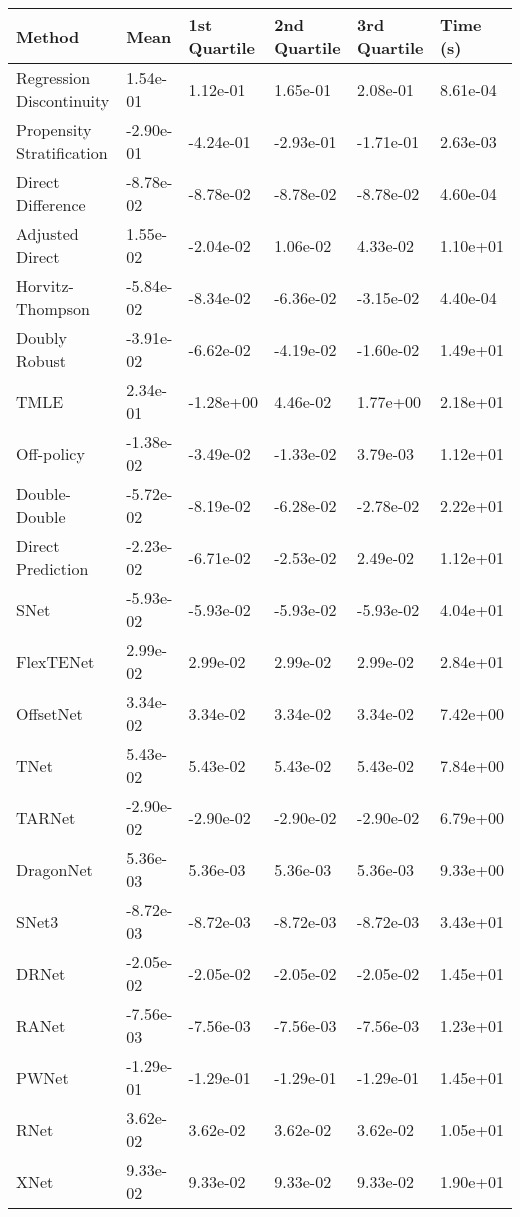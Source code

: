 \begin{tabular}{llllll}
  \toprule
  \textbf{Method} & \textbf{Mean} & \textbf{1st Quartile} & \textbf{2nd Quartile} & \textbf{3rd Quartile} & \textbf{Time (s)} \\ \midrule 
Regression Discontinuity & 1.54e-01 & 1.12e-01 & 1.65e-01 & 2.08e-01 & 8.61e-04\\
Propensity Stratification & -2.90e-01 & -4.24e-01 & -2.93e-01 & -1.71e-01 & 2.63e-03\\
Direct Difference & -8.78e-02 & -8.78e-02 & -8.78e-02 & -8.78e-02 & 4.60e-04\\
Adjusted Direct & 1.55e-02 & -2.04e-02 & 1.06e-02 & 4.33e-02 & 1.10e+01\\
Horvitz-Thompson & -5.84e-02 & -8.34e-02 & -6.36e-02 & -3.15e-02 & 4.40e-04\\
Doubly Robust & -3.91e-02 & -6.62e-02 & -4.19e-02 & -1.60e-02 & 1.49e+01\\
TMLE & 2.34e-01 & -1.28e+00 & 4.46e-02 & 1.77e+00 & 2.18e+01\\
Off-policy & -1.38e-02 & -3.49e-02 & -1.33e-02 & 3.79e-03 & 1.12e+01\\
Double-Double & -5.72e-02 & -8.19e-02 & -6.28e-02 & -2.78e-02 & 2.22e+01\\
Direct Prediction & -2.23e-02 & -6.71e-02 & -2.53e-02 & 2.49e-02 & 1.12e+01\\
SNet & -5.93e-02 & -5.93e-02 & -5.93e-02 & -5.93e-02 & 4.04e+01\\
FlexTENet & 2.99e-02 & 2.99e-02 & 2.99e-02 & 2.99e-02 & 2.84e+01\\
OffsetNet & 3.34e-02 & 3.34e-02 & 3.34e-02 & 3.34e-02 & 7.42e+00\\
TNet & 5.43e-02 & 5.43e-02 & 5.43e-02 & 5.43e-02 & 7.84e+00\\
TARNet & -2.90e-02 & -2.90e-02 & -2.90e-02 & -2.90e-02 & 6.79e+00\\
DragonNet & 5.36e-03 & 5.36e-03 & 5.36e-03 & 5.36e-03 & 9.33e+00\\
SNet3 & -8.72e-03 & -8.72e-03 & -8.72e-03 & -8.72e-03 & 3.43e+01\\
DRNet & -2.05e-02 & -2.05e-02 & -2.05e-02 & -2.05e-02 & 1.45e+01\\
RANet & -7.56e-03 & -7.56e-03 & -7.56e-03 & -7.56e-03 & 1.23e+01\\
PWNet & -1.29e-01 & -1.29e-01 & -1.29e-01 & -1.29e-01 & 1.45e+01\\
RNet & 3.62e-02 & 3.62e-02 & 3.62e-02 & 3.62e-02 & 1.05e+01\\
XNet & 9.33e-02 & 9.33e-02 & 9.33e-02 & 9.33e-02 & 1.90e+01\\
\bottomrule
\end{tabular}